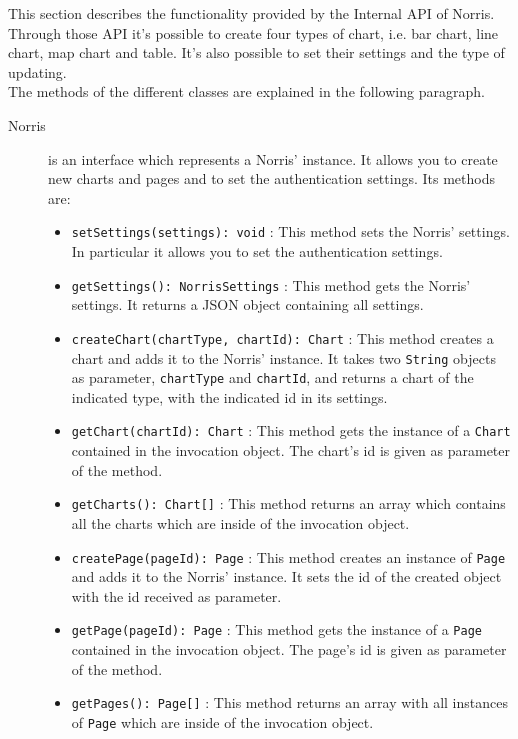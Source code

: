 	This section describes the functionality provided by the Internal API of Norris. Through those API it's possible to create four types of chart, i.e. bar chart, line chart, map chart and table. It's also possible to set their settings and the type of updating.\\ The methods of the different classes are explained in the following paragraph.
	\begin{description}
	\item[Norris] is an interface which represents a Norris' instance. It allows you to create new charts and pages and to set the authentication settings. Its methods are:
		\begin{itemize}
		\item \texttt{setSettings(settings): void} : This method sets the Norris' settings. In particular it allows you to set the authentication settings.
		\item \texttt{getSettings(): NorrisSettings} : This method gets the Norris' settings. It returns a JSON object containing all settings.
		\item \texttt{createChart(chartType, chartId): Chart} : This method creates a chart and adds it to the Norris' instance. It takes two \texttt{String} objects as parameter, \texttt{chartType} and \texttt{chartId}, and returns a chart of the indicated type, with the indicated id in its settings.
		\item \texttt{getChart(chartId): Chart} : This method gets the instance of a \texttt{Chart} contained in the invocation object. The chart's id is given as parameter of the method.
		\item \texttt{getCharts(): Chart[]} : This method returns an array which contains all the charts which are inside of the invocation object.
		\item \texttt{createPage(pageId): Page} : This method creates an instance of \texttt{Page} and adds it to the Norris' instance. It sets the id of the created object with the id received as parameter.
		\item \texttt{getPage(pageId): Page} : This method gets the instance of a \texttt{Page} contained in the invocation object. The page's id is given as parameter of the method.
		\item \texttt{getPages(): Page[]} : This method returns an array with all instances of \texttt{Page} which are inside of the invocation object.
		

\end{itemize}
\end{description}
